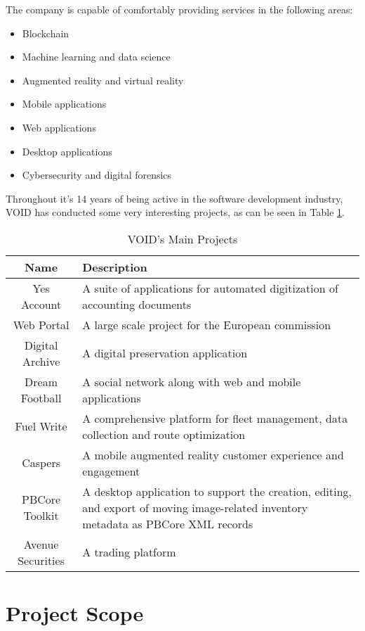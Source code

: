 The company is capable of comfortably providing services in the following areas:
\begin{itemize}
 \item Blockchain
 \item Machine learning and data science
 \item Augmented reality and virtual reality
 \item Mobile applications
 \item Web applications
 \item Desktop applications
 \item Cybersecurity and digital forensics
\end{itemize}

Throughout it's 14 years of being active in the software development industry, VOID has conducted some very interesting projects, as can be seen in Table \ref{tab:voidProjects}.

\begin{table}[ht]
  \begin{tabularx}{\textwidth}{@{}|c| *1{>{\centering\arraybackslash}X}@{}|}
    \hline
    \textbf{Name} & \textbf{Description} \\
    \hline\hline
    Yes Account & A suite of applications for automated digitization of accounting documents \\
    \hline
    Web Portal & A large scale project for the European commission \\
    \hline
    Digital Archive & A digital preservation application \\
    \hline
    Dream Football & A social network along with web and mobile applications  \\
    \hline
    Fuel Write & A comprehensive platform for fleet management, data collection and route optimization \\
    \hline
    Caspers & A mobile augmented reality customer experience and engagement \\
    \hline
    PBCore Toolkit & A desktop application to support the creation, editing, and export of moving image-related inventory metadata as PBCore XML records \\
    \hline
    Avenue Securities & A trading platform \\
    \hline
  \end{tabularx}
  \caption{VOID's Main Projects}
  \label{tab:voidProjects}
\end{table}

\section{Project Scope}


